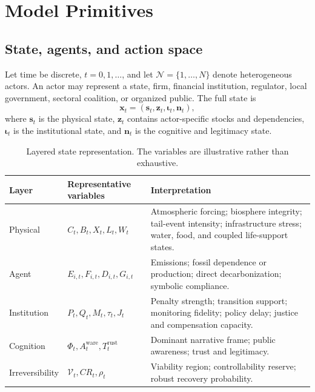 \documentclass[11pt,a4paper]{article}
\numberwithin{equation}{section}
\theoremstyle{definition}
\theoremstyle{plain}
\theoremstyle{remark}
\newcommand{\state}{\bm{x}}
\newcommand{\inst}{\bm{\iota}}
\newcommand{\narr}{\bm{n}}
\begin{document}
\section{Model Primitives}

\subsection{State, agents, and action space}

Let time be discrete, $t=0,1,\ldots$, and let $\mathcal N=\{1,\ldots,N\}$ denote heterogeneous actors. An actor may represent a state, firm, financial institution, regulator, local government, sectoral coalition, or organized public. The full state is
\begin{equation}
  \state_t = (\bm{s}_t,\bm{z}_t,\inst_t,\narr_t),
  \label{eq:fullstate}
\end{equation}
where $\bm{s}_t$ is the physical state, $\bm{z}_t$ contains actor-specific stocks and dependencies, $\inst_t$ is the institutional state, and $\narr_t$ is the cognitive and legitimacy state.

\begin{table}[H]
\centering
\caption{Layered state representation. The variables are illustrative rather than exhaustive.}
\label{tab:layers}
\begin{tabularx}{\textwidth}{@{}L{0.18\textwidth}L{0.26\textwidth}Y@{}}
\toprule
\textbf{Layer} & \textbf{Representative variables} & \textbf{Interpretation} \\
\midrule
Physical & $C_t,B_t,X_t,L_t,W_t$ & Atmospheric forcing; biosphere integrity; tail-event intensity; infrastructure stress; water, food, and coupled life-support states. \\
Agent & $E_{i,t},F_{i,t},D_{i,t},G_{i,t}$ & Emissions; fossil dependence or production; direct decarbonization; symbolic compliance. \\
Institution & $P_t,Q_t,M_t,\tau_t,J_t$ & Penalty strength; transition support; monitoring fidelity; policy delay; justice and compensation capacity. \\
Cognition & $\Phi_t,A_t^{\mathrm{ware}},T_t^{\mathrm{rust}}$ & Dominant narrative frame; public awareness; trust and legitimacy. \\
Irreversibility & $\mathcal V_t,CR_t,\rho_t$ & Viability region; controllability reserve; robust recovery probability. \\
\bottomrule
\end{tabularx}
\end{table}
\end{document}
